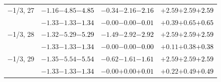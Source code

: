 \documentclass[compress]{beamer}
\begin{document}
\begin{frame}
\begin{tabular}{r | c | c | c}
$-$1/3, 27 & $-1.16$\hspace{0.1 cm}$-4.85$\hspace{0.1 cm}\textcolor{black}{$-4.85$} & $-0.34$\hspace{0.1 cm}$-2.16$\hspace{0.1 cm}\textcolor{black}{$-2.16$} & $+2.59$\hspace{0.1 cm}$+2.59$\hspace{0.1 cm}\textcolor{black}{$+2.59$} \\
           & $-1.33$\hspace{0.1 cm}$-1.33$\hspace{0.1 cm}\textcolor{black}{$-1.34$} & $-0.00$\hspace{0.1 cm}$-0.00$\hspace{0.1 cm}\textcolor{black}{$-0.01$} & $+0.39$\hspace{0.1 cm}$+0.65$\hspace{0.1 cm}\textcolor{black}{$+0.65$} \\
$-$1/3, 28 & $-1.32$\hspace{0.1 cm}$-5.29$\hspace{0.1 cm}\textcolor{black}{$-5.29$} & $-1.49$\hspace{0.1 cm}$-2.92$\hspace{0.1 cm}\textcolor{black}{$-2.92$} & $+2.59$\hspace{0.1 cm}$+2.59$\hspace{0.1 cm}\textcolor{black}{$+2.59$} \\
           & $-1.33$\hspace{0.1 cm}$-1.33$\hspace{0.1 cm}\textcolor{black}{$-1.34$} & $-0.00$\hspace{0.1 cm}$-0.00$\hspace{0.1 cm}\textcolor{black}{$-0.00$} & $+0.11$\hspace{0.1 cm}$+0.38$\hspace{0.1 cm}\textcolor{black}{$+0.38$} \\
$-$1/3, 29 & $-1.35$\hspace{0.1 cm}$-5.54$\hspace{0.1 cm}\textcolor{black}{$-5.54$} & $-0.62$\hspace{0.1 cm}$-1.61$\hspace{0.1 cm}\textcolor{black}{$-1.61$} & $+2.59$\hspace{0.1 cm}$+2.59$\hspace{0.1 cm}\textcolor{black}{$+2.59$} \\
           & $-1.33$\hspace{0.1 cm}$-1.33$\hspace{0.1 cm}\textcolor{black}{$-1.34$} & $-0.00$\hspace{0.1 cm}$+0.00$\hspace{0.1 cm}\textcolor{black}{$+0.01$} & $+0.22$\hspace{0.1 cm}$+0.49$\hspace{0.1 cm}\textcolor{black}{$+0.49$} \\

\end{tabular}
\end{frame}
\end{document}
